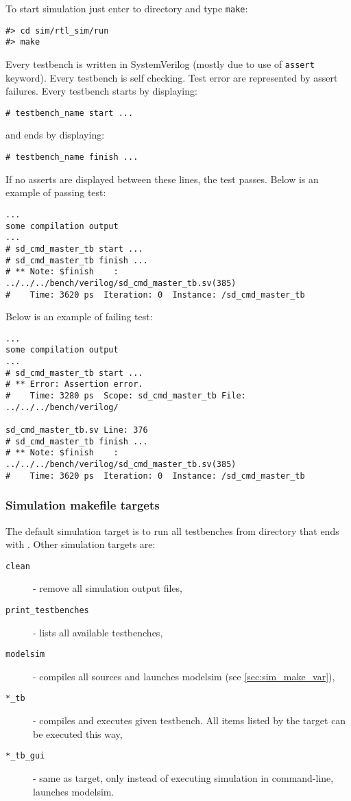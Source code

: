     To start simulation just enter to  directory and type \texttt{make}:
    \begin{verbatim}
#> cd sim/rtl_sim/run
#> make
    \end{verbatim}
    
    Every testbench is written in SystemVerilog (mostly due to use of \texttt{assert} keyword). Every testbench is self checking. Test error are represented by
    assert failures. Every testbench starts by displaying: 
    \begin{verbatim}
# testbench_name start ...
    \end{verbatim} 
    and ends by displaying:
    \begin{verbatim}
# testbench_name finish ...
    \end{verbatim} 
    If no asserts are displayed between these lines, the test passes. Below is an example of passing test:
    \begin{verbatim}
... 
some compilation output
...
# sd_cmd_master_tb start ...
# sd_cmd_master_tb finish ...
# ** Note: $finish    : ../../../bench/verilog/sd_cmd_master_tb.sv(385)
#    Time: 3620 ps  Iteration: 0  Instance: /sd_cmd_master_tb
    \end{verbatim}
    Below is an example of failing test:
    \begin{verbatim}
... 
some compilation output
...
# sd_cmd_master_tb start ...
# ** Error: Assertion error.
#    Time: 3280 ps  Scope: sd_cmd_master_tb File: ../../../bench/verilog/
                                                    sd_cmd_master_tb.sv Line: 376
# sd_cmd_master_tb finish ...
# ** Note: $finish    : ../../../bench/verilog/sd_cmd_master_tb.sv(385)
#    Time: 3620 ps  Iteration: 0  Instance: /sd_cmd_master_tb
    \end{verbatim}
    
    \subsubsection{Simulation makefile targets}
    \label{sec:sim_make_targ}

    The default simulation target is to run all testbenches from  directory that ends with . Other simulation targets are:
    \begin{description}
    \item[\texttt{clean}] - remove all simulation output files,
    \item[\texttt{print\_testbenches}] - lists all available testbenches,
    \item[\texttt{modelsim}] - compiles all sources and launches modelsim (see \ref{sec:sim_make_var}),
    \item[\texttt{*\_tb}] - compiles and executes given testbench. All items listed by the  target can be executed this way,
    \item[\texttt{*\_tb\_gui}] - same as  target, only instead of executing simulation in command-line, launches modelsim.
    \end{description}
    
